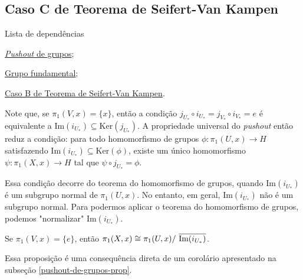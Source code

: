 \subsection{Caso C de Teorema de Seifert-Van Kampen} %
\label{teorema-s-vk-caso-c-prop}
\begin{titlemize}{Lista de dependências}
    \item \hyperref[pushout-de-grupos-prop]{\emph{Pushout} de grupos};\\
    \item \hyperref[grupo-fundamental]{Grupo fundamental};\\
    \item \hyperref[teorema-s-vk-caso-b-prop]{Caso B de Teorema de Seifert-Van Kampen}.
\end{titlemize}
Note que, se $\pi_1(V,x)=\{x\}$, então a condição $j_{U_*}\circ i_{U_*}=j_{V_*}\circ i_{V_*}= e$ é equivalente a $\text{Im}(i_{U_*})\subseteq \text{Ker}(j_{U_*})$. A propriedade universal do \emph{pushout} então reduz a condição: para todo homomorfismo de grupos $\phi:\pi_1(U,x)\rightarrow H$ satisfazendo $\text{Im}(i_{U_*})\subseteq \text{Ker}(\phi)$, existe um único homomorfismo $\psi:\pi_1(X,x)\rightarrow H$ tal que $\psi\circ j_{U_*}=\phi$.

Essa condição decorre do teorema do homomorfismo de grupos, quando $\text{Im}(i_{U_*})$ é um subgrupo normal de $\pi_1(U,x)$. No entanto, em geral, $\text{Im}(i_{U_*})$ não é um subgrupo normal. Para podermos aplicar o teorema do homomorfismo de grupos, podemos "normalizar" $\text{Im}(i_{U_*})$. 

\begin{prop}
    Se $\pi_1(V,x)=\{e\}$, então $\pi_1(X,x)\cong \pi_1(U,x)/\ \overline{\textnormal{Im}(i_{U_*})}$.
\end{prop}

\begin{dem}
    Essa proposição é uma consequência direta de um corolário apresentado na subseção \ref{pushout-de-grupos-prop}.
\end{dem}

